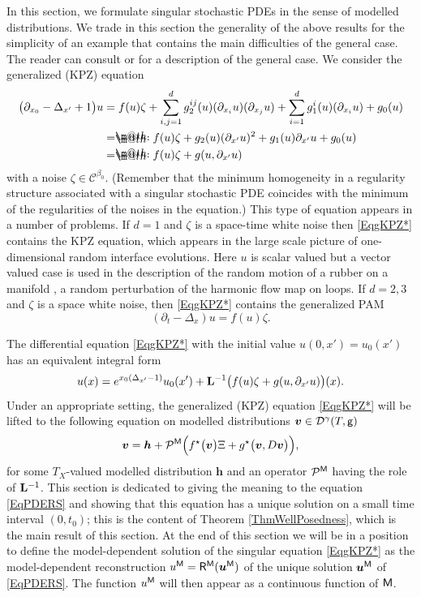 \documentclass[10pt, reqno]{amsart}
\makeatletter
\numberwithin{subsection}{section}
\numberwithin{subsubsection}{subsection}
\numberwithin{equation}{section} %
\theoremstyle{mystyle}
\theoremstyle{mystyle2}
\theoremstyle{mystyle3}
\newcommand{\bsh}{\boldsymbol{h}}
\newcommand{\bsu}{\boldsymbol{u}}
\newcommand{\bsv}{\boldsymbol{v}}
\newcommand{\ssk}{\smallskip}
\newcommand{\mcC}{\mathcal{C}}
\newcommand{\mcD}{\mathcal{D}}
\newcommand{\mcP}{\mathcal{P}}
\newcommand*{\eqdef}{=\mathrel{\rlap{%
                     \raisebox{0.3ex}{$\m@th\cdot$}}%
                     \raisebox{-0.3ex}{$\m@th\cdot$}}%
                     }
\makeatother
\begin{document}
In this section, we formulate singular stochastic PDEs in the sense of modelled distributions. We trade in this section the generality of the above results for the simplicity of an example that contains the main difficulties of the general case. The reader can consult \cite{Hai14} or \cite{BCCH18} for a description of the general case. We consider the generalized 
(KPZ) equation
\begin{equation}   \label{EqgKPZ*}   \begin{split}
\big(\partial_{x_0}-\Delta_{x'}+1\big) u &= f(u)\zeta + 
\sum_{i,j=1}^d g_2^{ij}(u)(\partial_{x_i}u)(\partial_{x_j}u) + \sum_{i=1}^d g_1^i(u)(\partial_{x_i} u) +g_0(u)  \\
&\eqdef f(u)\zeta + g_2(u)(\partial_{x'} u)^2+g_1(u)\partial_{x'}u+g_0(u)\\
&\eqdef f(u)\zeta +g(u,\partial_{x'} u)
\end{split} \end{equation}
with a noise $\zeta\in\mcC^{\beta_0}$. (Remember that the minimum homogeneity in a regularity structure associated with a singular stochastic PDE coincides with the minimum of the regularities of the noises in the equation.) This type of equation appears in a number of problems. If $d=1$ and $\zeta$ is a space-time white noise then \eqref{EqgKPZ*} contains the KPZ equation, which appears in the large scale picture of one-dimensional random interface evolutions. Here $u$ is scalar valued but a vector valued case is used in the description of the random motion of a rubber on a manifold \cite{HairerString}, a random perturbation of the harmonic flow map on loops. If $d=2,3$ and $\zeta$ is a space white noise, then \eqref{EqgKPZ*} contains the generalized PAM
$$
(\partial_t-\Delta_x)u=f(u)\zeta.
$$

\ssk

The differential equation \eqref{EqgKPZ*} with the initial value $u(0,x')=u_0(x')$ has an equivalent integral form
$$
u(x)=e^{x_0(\Delta_{x'}-1)}u_0(x')+{\bf L}^{-1}\big(f(u)\zeta+g(u,\partial_{x'}u)\big)(x).
$$
Under an appropriate setting, the generalized (KPZ) equation \eqref{EqgKPZ*} will be lifted to the following equation on modelled distributions $\bsv\in\mcD^\gamma(T,\sf g)$
\begin{equation}   \label{EqPDERS}
\bsv = \bsh+\mcP^{\sf M}\Big(f^\star\big(\bsv\big) \Xi + g^\star\big(\bsv, D\bsv \big)\Big),
\end{equation}
for some $T_X$-valued modelled distribution $\bsh$ and an operator $\mcP^{\sf M}$ having the role of ${\bf L}^{-1}$. This section is dedicated to giving the meaning to the equation \eqref{EqPDERS} and showing that this equation has a unique solution on a small time interval $(0,t_0)$; this is the content of Theorem \ref{ThmWellPosedness}, which is the main result of this section. At the end of this section we will be in a position to define the model-dependent solution of the singular equation \eqref{EqgKPZ*} as the model-dependent reconstruction $u^{\sf M} = {\sf R}^{\sf M}(\bsu^{\sf M})$ of the unique solution $\bsu^{\sf M}$ of \eqref{EqPDERS}. The function $u^{\sf M}$ will then appear as a continuous function of $\sf M$.  
\end{document}
